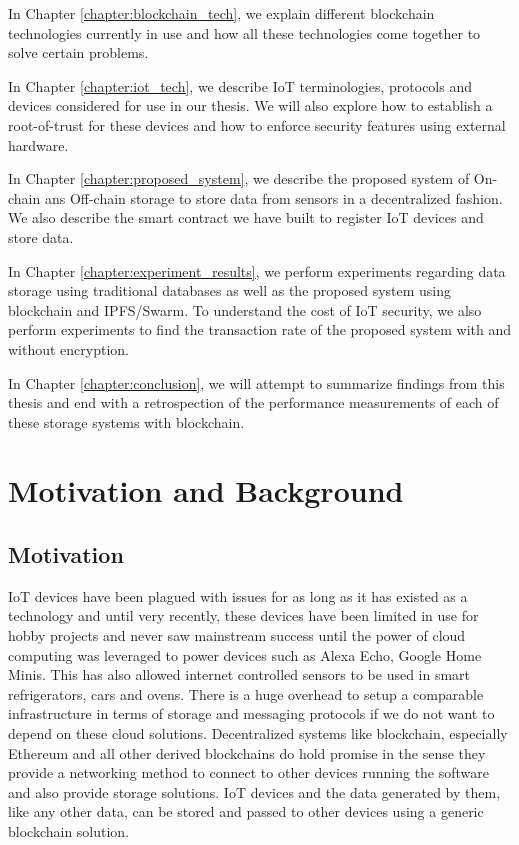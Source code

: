 \documentclass[11pt,openright]{report}
\begin{document}
\noindent In Chapter \ref{chapter:blockchain_tech}, we explain different blockchain technologies currently in use and how all these technologies come together to solve certain problems. \newline

\noindent In Chapter \ref{chapter:iot_tech}, we describe IoT terminologies, protocols and devices considered for use in our thesis. We will also explore how to establish a root-of-trust for these devices and how to enforce security features using external hardware. \newline

\noindent In Chapter \ref{chapter:proposed_system}, we describe the proposed system of On-chain ans Off-chain storage to store data from sensors in a decentralized fashion. We also describe the smart contract we have built to register IoT devices and store data.\newline

\noindent In Chapter \ref{chapter:experiment_results}, we perform experiments regarding data storage using traditional databases as well as the proposed system using blockchain and IPFS/Swarm. To understand the cost of IoT security, we also perform experiments to find the transaction rate of the proposed system with and without encryption.\newline

\noindent In Chapter \ref{chapter:conclusion}, we will attempt to summarize findings from this thesis and end with a retrospection of the performance measurements of each of these storage systems with blockchain.\newline 

\chapter{Motivation and Background} \label{chapter:background}
\section{Motivation}\label{section:motivation}
IoT devices have been plagued with issues for as long as it has existed as a technology and until very recently, these devices have been limited in use for hobby projects and never saw mainstream success until the power of cloud computing was leveraged to power devices such as Alexa Echo, Google Home Minis. This has also allowed internet controlled sensors to be used in smart refrigerators, cars and ovens. There is a huge overhead to setup a comparable infrastructure in terms of storage and messaging protocols if we do not want to depend on these cloud solutions. Decentralized systems like blockchain, especially Ethereum \cite{7467408}  and all other derived blockchains do hold promise in the sense they provide a networking method to connect to other devices running the software and also provide storage solutions. IoT devices and the data generated by them, like any other data, can be stored and passed to other devices using a generic blockchain solution.
\end{document}
